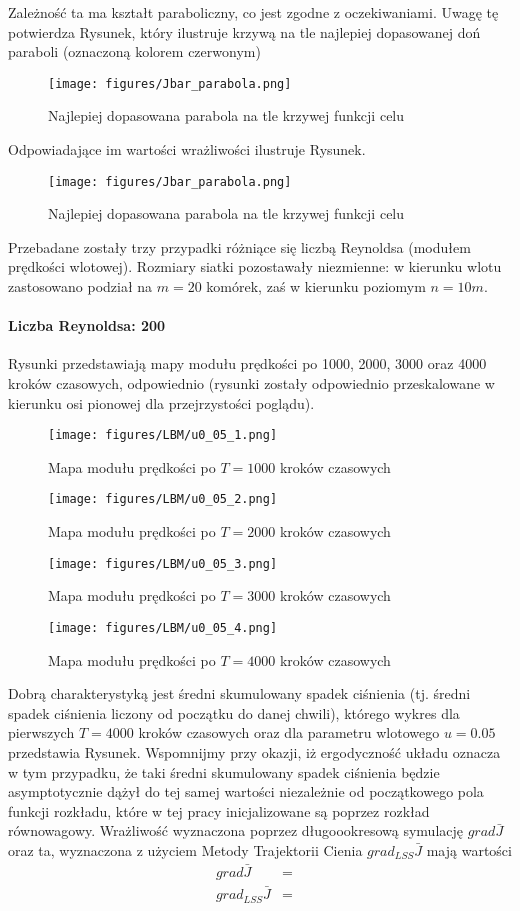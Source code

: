 \documentclass[12pt]{article}
\begin{document}
Zależność ta ma kształt paraboliczny, co jest zgodne z oczekiwaniami. Uwagę tę potwierdza Rysunek, który ilustruje krzywą na tle najlepiej dopasowanej doń paraboli (oznaczoną kolorem czerwonym)
\begin{figure}[H]
	\texttt{[image: figures/Jbar\_parabola.png]} 
	\centering
	\caption{Najlepiej dopasowana parabola na tle krzywej funkcji celu}
\end{figure}
Odpowiadające im wartości wrażliwości ilustruje Rysunek.
\begin{figure}[H]
	\texttt{[image: figures/Jbar\_parabola.png]} 
	\centering
	\caption{Najlepiej dopasowana parabola na tle krzywej funkcji celu}
\end{figure}
Przebadane zostały trzy przypadki różniące się liczbą Reynoldsa (modułem prędkości wlotowej). Rozmiary siatki pozostawały niezmienne: w kierunku wlotu zastosowano podział na $ m=20 $ komórek, zaś w kierunku poziomym $ n=10m $.
\paragraph{Liczba Reynoldsa: 200}
Rysunki przedstawiają mapy modułu prędkości po 1000, 2000, 3000 oraz 4000 kroków czasowych, odpowiednio (rysunki zostały odpowiednio przeskalowane w kierunku osi pionowej dla przejrzystości poglądu).
\begin{figure}[H]
	\texttt{[image: figures/LBM/u0\_05\_1.png]} 
	\caption{Mapa modułu prędkości po $ T=1000 $ kroków czasowych}
\end{figure}
\begin{figure}[H]
	\texttt{[image: figures/LBM/u0\_05\_2.png]} 
	\caption{Mapa modułu prędkości po $ T=2000 $ kroków czasowych}
\end{figure}
\begin{figure}[H]
	\texttt{[image: figures/LBM/u0\_05\_3.png]} 
	\caption{Mapa modułu prędkości po $ T=3000 $ kroków czasowych}
\end{figure}
\begin{figure}[H]
	\texttt{[image: figures/LBM/u0\_05\_4.png]} 
	\caption{Mapa modułu prędkości po $ T=4000 $ kroków czasowych}
\end{figure}
Dobrą charakterystyką jest średni skumulowany spadek ciśnienia (tj. średni spadek ciśnienia liczony od początku do danej chwili), którego wykres dla pierwszych $ T = 4000 $  kroków czasowych oraz dla parametru wlotowego $ u=0.05 $ przedstawia Rysunek.
Wspomnijmy przy okazji, iż ergodyczność układu oznacza w tym przypadku, że taki średni skumulowany spadek ciśnienia będzie asymptotycznie dążył do tej samej wartości niezależnie od początkowego pola funkcji rozkładu, które w tej pracy inicjalizowane są poprzez rozkład równowagowy.\newline
Wrażliwość wyznaczona poprzez długoookresową symulację $ grad\bar{J} $ oraz ta, wyznaczona z użyciem Metody Trajektorii Cienia $ grad_{LSS}\bar{J} $ mają wartości
\begin{equation}
\begin{array}{rcl}
grad\bar{J} &=& \\
grad_{LSS}\bar{J} &=& 
\end{array} 
\label{result200}
\end{equation}
\end{document}
